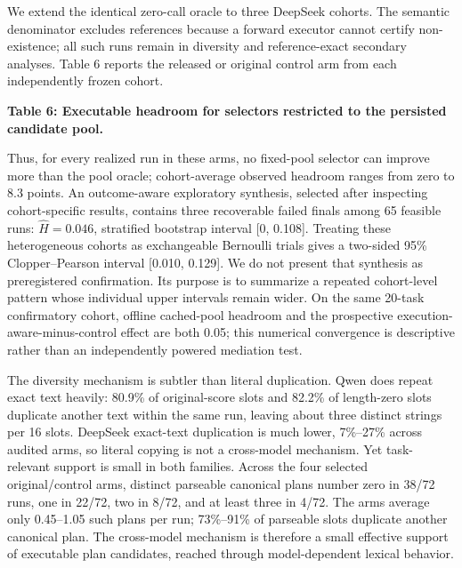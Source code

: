 \documentclass{article}
\begin{document}
We extend the identical zero-call oracle to three DeepSeek cohorts. The semantic denominator excludes \texttt{} references because a forward executor cannot certify non-existence; all such runs remain in diversity and reference-exact secondary analyses. Table 6 reports the released or original control arm from each independently frozen cohort.

\textbf{Table 6: Executable headroom for selectors restricted to the persisted candidate pool.}

\begin{center}
\end{center}

Thus, for every realized run in these arms, no fixed-pool selector can improve more than the pool oracle; cohort-average observed headroom ranges from zero to 8.3 points. An outcome-aware exploratory synthesis, selected after inspecting cohort-specific results, contains three recoverable failed finals among 65 feasible runs: \(\widehat H=0.046\), stratified bootstrap interval [0, 0.108]. Treating these heterogeneous cohorts as exchangeable Bernoulli trials gives a two-sided 95\% Clopper--Pearson interval [0.010, 0.129]. We do not present that synthesis as preregistered confirmation. Its purpose is to summarize a repeated cohort-level pattern whose individual upper intervals remain wider. On the same 20-task confirmatory cohort, offline cached-pool headroom and the prospective execution-aware-minus-control effect are both 0.05; this numerical convergence is descriptive rather than an independently powered mediation test.

The diversity mechanism is subtler than literal duplication. Qwen does repeat exact text heavily: 80.9\% of original-score slots and 82.2\% of length-zero slots duplicate another text within the same run, leaving about three distinct strings per 16 slots. DeepSeek exact-text duplication is much lower, 7\%--27\% across audited arms, so literal copying is not a cross-model mechanism. Yet task-relevant support is small in both families. Across the four selected original/control arms, distinct parseable canonical plans number zero in 38/72 runs, one in 22/72, two in 8/72, and at least three in 4/72. The arms average only 0.45--1.05 such plans per run; 73\%--91\% of parseable slots duplicate another canonical plan. The cross-model mechanism is therefore a small effective support of executable plan candidates, reached through model-dependent lexical behavior.
\end{document}
